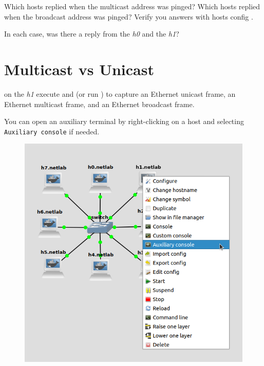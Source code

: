 \documentclass{../UTNetLab}
\begin{document}
\begin{report}
    \item Which hosts replied when the multicast address was pinged?
    Which hosts replied when the broadcast address was pinged?
    Verify you answers with hosts config .

    \item In each case, was there a reply from the \textit{h0} and the \textit{h1}?
\end{report}

\section{Multicast vs Unicast}
\label{sec:multicast-vs-unicast}
on the \textit{h1} execute  and  (or run ) to capture an Ethernet unicast frame, an Ethernet multicast frame, and an Ethernet broadcast frame.

You can open an auxiliary terminal by right-clicking on a host and selecting \texttt{Auxiliary console} if needed.
\begin{figure}[H]
    \centering
    \includegraphics[scale=1.6]{img/auxiliary}
\end{figure}
\end{document}
